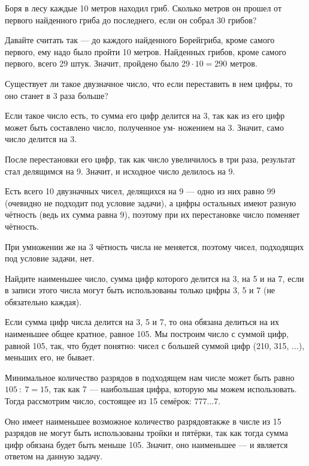 

\begin{itemize}

	\itA Боря в лесу каждые 10 метров находил гриб. Сколько метров он прошел от первого найденного гриба до последнего, если он собрал 30 грибов?
	
	\itr Давайте считать так — до каждого найденного Борей\linebreak гриба, кроме самого первого, ему надо было пройти 10 метров. Найденных грибов, кроме самого первого, всего 29 штук. Значит, пройдено было $29 \cdot 10 = 290$ метров.
	
	\itB Существует ли такое двузначное число, что если переставить в нем цифры, то оно станет в 3 раза больше?
	
	\itr Если такое число есть, то сумма его цифр делится на 3, так как из его цифр может быть составлено число, полученное ум- ножением на 3. Значит, само число делится на 3.
	
	После перестановки его цифр, так как число увеличилось в три раза, результат стал делящимся на 9. Значит, и исходное число делилось на 9.
	
	Есть всего 10 двузначных чисел, делящихся на 9 — одно из них равно 99 (очевидно не подходит под условие задачи), а цифры остальных имеют разную чётность (ведь их сумма равна 9), поэтому при их перестановке число поменяет чётность.
	
	При умножении же на 3 чётность числа не меняется, поэтому чисел, подходящих под условие задачи, нет.
	
	\itC Найдите наименьшее число, сумма цифр которого делится на 3, на 5 и на 7, если в записи этого числа могут быть использованы только цифры 3, 5 и 7 (не обязательно каждая).
	
	\itr Если сумма цифр числа делится на 3, 5 и 7, то она обязана делиться на их наименьшее общее кратное, равное 105. Мы построим число с суммой цифр, равной 105, так, что будет понятно: чисел с большей суммой цифр (210, 315, ...), меньших его, не бывает.
	
	Минимальное количество разрядов в подходящем нам числе может быть равно $105\ :\ 7 = 15$, так как 7 — наибольшая цифра, которую мы можем использовать. Тогда рассмотрим число, состоящее из 15 семёрок: 777...7.
	
	Оно имеет наименьшее возможное количество разрядов\scolon также в числе из 15 разрядов не могут быть использованы тройки и пятёрки, так как тогда сумма цифр обязана будет быть меньше 105. Значит, оно наименьшее — и является ответом на данную задачу.

\end{itemize}

